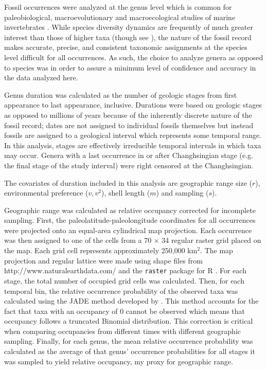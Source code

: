 \documentclass[11pt]{article}
\begin{document}
Fossil occurrences were analyzed at the genus level which is common for paleobiological, macroevolutionary and macroecological studies of marine invertebrates \citep{Alroy2010,Foote2013,Harnik2013,Kiessling2007a,Miller2009a,Nurnberg2013a,Nurnberg2015,Payne2007,Ritterbush2017,Simpson2009,Vilhena2013}. While species diversity dynamics are frequently of much greater interest than those of higher taxa (though see \citealt{Foote2014b,Hoehn2015}), the nature of the fossil record makes accurate, precise, and consistent taxonomic assignments at the species level difficult for all occurrences. As such, the choice to analyze genera as opposed to species was in order to assure a minimum level of confidence and accuracy in the data analyzed here.

Genus duration was calculated as the number of geologic stages from first appearance to last appearance, inclusive. Durations were based on geologic stages as opposed to millions of years because of the inherently discrete nature of the fossil record; dates are not assigned to individual fossils themselves but instead fossils are assigned to a geological interval which represents some temporal range. In this analysis, stages are effectively irreducible temporal intervals in which taxa may occur. Genera with a last occurrence in or after Changhsingian stage (e.g. the final stage of the study interval) were right censored at the Changhsingian. 

The covariates of duration included in this analysis are geographic range size (\(r\)), environmental preference (\(v, v^{2}\)), shell length (\(m\)) and sampling (\(s\)).

Geographic range was calculated as relative occupancy corrected for incomplete sampling. First, the paleolatitude-paleolongitude coordinates for all occurrences were projected onto an equal-area cylindrical map projection. Each occurrence was then assigned to one of the cells from a 70 \(\times\) 34 regular raster grid placed on the map. Each grid cell represents approximately 250,000 km\(^{2}\). The map projection and regular lattice were made using shape files from http://www.naturalearthdata.com/ and the \texttt{raster} package for R \citep{raster}. For each stage, the total number of occupied grid cells was calculated. Then, for each temporal bin, the relative occurrence probability of the observed taxa was calculated using the \uppercase{jade} method developed by \citet{Chao2015a}. This method accounts for the fact that taxa with an occupancy of 0 cannot be observed which means that occupancy follows a truncated Binomial distribution. This correction is critical when comparing occupancies from different times with different geographic sampling. Finally, for each genus, the mean relative occurrence probability was calculated as the average of that genus' occurrence probabilities for all stages it was sampled to yield relative occupancy, my proxy for geographic range.
\end{document}
